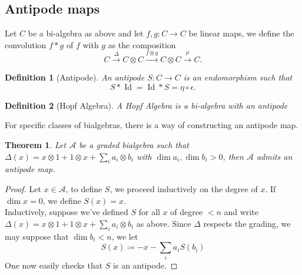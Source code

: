 \documentclass[11pt, a4paper]{article}
\DeclareMathOperator*{\id}{Id}
\newtheorem{thm}{Theorem}
\newtheorem{defn}{Definition}
\theoremstyle{plain}
\newtheorem*{proof}{Proof}
\begin{document}
\subsection{Antipode maps}
Let $C$ be a bi-algebra as above and let $f,g\colon C\to C$ be linear maps, we define the convolution $f\ast g$ of $f$ with $g$ as the composition
\[ 
	C \xrightarrow{\Delta} C\otimes C \xrightarrow{f\otimes g} C\otimes C \xrightarrow{\mu} C.
\]
\begin{defn}[Antipode]
	An antipode $S\colon C\to C$ is an endomorphism such that
	\[ 
	S\ast \id = \id\ast S = \eta\circ \epsilon.
	\]
\end{defn}
\begin{defn}[Hopf Algebra]
A Hopf Algebra is a bi-algebra with an antipode
\end{defn}
For specific classes of bialgebras, there is a way of constructing an antipode map.
\begin{thm}
Let $\mathcal{A}$ be a graded bialgebra such that $\Delta( x) = x\otimes 1 + 1 \otimes x + \sum_i a_i \otimes b_i $ with $\dim a_i,\dim b_i >0$, then $\mathcal{A}$ admits an antipode map.
\end{thm}
\begin{proof}
Let $x \in \mathcal{A}$, to define $S$, we proceed inductively on the degree of $x$. If $\dim x = 0$, we define $S( x) = x$.\\
Inductively, suppose we've defined $S$ for all $x$ of degree $<n$ and write $\Delta( x) = x\otimes 1 + 1 \otimes x + \sum_i a_i \otimes b_i$ as above. Since $\Delta$ respects the grading, we may suppose that $\dim b_i <n$, we let
\[ 
S( x) \coloneq -x - \sum_i a_i S( b_i) 
\]
One now easily checks that $S$ is an antipode.
\end{proof}



\end{document}
